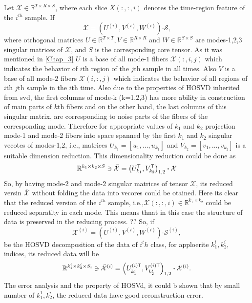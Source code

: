 \documentclass[journal]{IEEEtran}
\begin{document}
Let $\mathcal{X}\in \mathbb{R}^{T \times R \times S}$, where each slice $X(:,:,i)$ denotes the time-region feature of the $i^{th}$ sample.
If 
\begin{equation}
\label{ho}
\mathcal{X} = 
\left(  
U^{(i)},V^{(i)},W^{(i)}
\right)\boldsymbol{\cdot} \mathcal{S},
\end{equation}
where otrhogonal matrices $U\in \mathbb{R}^{T\times T}, V\in \mathbb{R}^{R\times R} $ and $W\in \mathbb{R}^{S\times S}$ are modes-1,2,3 singular matrices of 
$\mathcal{X}$, and $S$ is the corresponding core tensor. As it was mentioned in \eqref{Chap_3} $U$ is a base of all mode-$ 1 $ fibers $\mathcal{X}(:,i,j)$ which indicates the behavior of $i$th region of the $j$th sample in all times. Also  $V$ is a base of all mode-$ 2 $ fibers $\mathcal{X}(i,:,j)$ which indicates the behavior of all regions of  $i$th $j$th sample in  the $i$th time.
Also due to the properties of HOSVD inherited from svd, the first columns of mode-k (k=1,2,3) has more ability in construction of main parts of $k$th fibers and on the other hand, the last columns of  this singular matrix, are corresponding to noise parts of the fibers of the corresponding mode.  Therefore for appropriate values of $k_1$ and $k_2$ projection mode-1 and mode-2 fibers into space spanned by  the first $k_1$ and $k_2$ singular vecotes of modes-1,2, i.e., matrices $U_{k_1}=[u_1,\ldots,u_{k_1}]$ and $V_{k_2}=[v_1,\ldots,v_{k_2}]$
is a suitable  dimension reduction. This dimensionality reduction could be done as
\begin{align}
\mathbb{R}^{k_1 \times k_2 \times S} \ni  \bar{{\mathcal{X}}} = \left( 
U_{k_1}^{\sf T}, V_{k_2}^{\sf T} 
\right)_{1,2}\boldsymbol{\cdot} \mathcal{X} \label{DR_Ven}
\end{align}
So, by having mode-2 and mode-2 singular matrices of tensor $\mathcal{X}$, its reduced versin $\overline{\mathcal{X}}$ without folding the data into vecores could be otained. Here its clear that the reduced version of the $i^{th}$ sample, i.e.,$\overline{\mathcal{X}}(:,:,i)\in \mathbb{R}^{k_1\times k_2}$ could be reduced separatlty in each mode. This means thnat in this case the structure of data is preserved in the reducing process. ??
So, if 
\begin{equation}
\label{ho}
\mathcal{X}^{(i)} = 
\left(  
U^{(i)},V^{(i)},W^{(i)}
\right)\boldsymbol{\cdot} \mathcal{S}^{(i)},
\end{equation}
be the HOSVD decomposition of the data of $i^th$ class, for apploerite $k_1^i, k_2^i$, indices, its reduced
data will be
\begin{align}
\mathbb{R}^{k_1^i \times k_2^i \times S_i} \ni  \bar{{\mathcal{X}}}^{(i)} = \left( 
U_{k_1^i}^{{(i)}\sf T}, V_{k_2^i}^{{(i)}\sf T} 
\right)_{1,2}\boldsymbol{\cdot} \mathcal{X}^{(i)} \label{DR_class}.
\end{align}
The error analysis and the property of HOSVd, it could b shown that by small number of $k_1^1, k_2^i$, the reduced data have good reconstruction error. 
\end{document}
